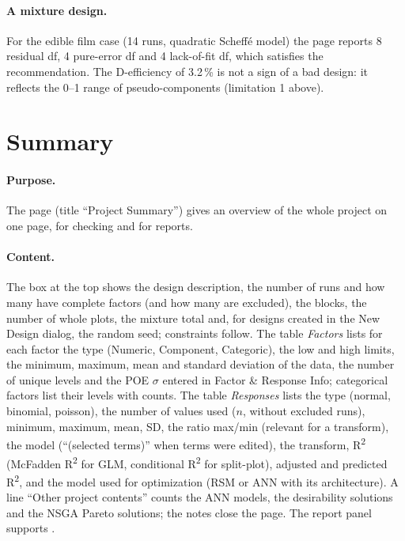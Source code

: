 \paragraph{A mixture design.} For the edible film case (14 runs, quadratic Scheff\'e model) the page reports 8
residual df, 4 pure-error df and 4 lack-of-fit df, which satisfies the recommendation. The D-efficiency of 3.2\,\%
is not a sign of a bad design: it reflects the 0--1 range of pseudo-components (limitation 1 above).

\section{Summary}
\label{sec:ch04-summary}

\paragraph{Purpose.} The  page (title ``Project Summary'') gives an overview of the whole project on one
page, for checking and for reports.

\paragraph{Content.} The box at the top shows the design description, the number of runs and how many have complete
factors (and how many are excluded), the blocks, the number of whole plots, the mixture total and, for designs created in the New
Design dialog, the random seed; constraints follow. The table \emph{Factors} lists for each factor the type (Numeric, Component,
Categoric), the low and high limits, the minimum, maximum, mean and standard deviation of the data, the number of
unique levels and the POE $\sigma$ entered in Factor \& Response Info; categorical factors list their levels with
counts. The table \emph{Responses} lists the type (normal, binomial, poisson), the number of values used ($n$, without
excluded runs), minimum, maximum, mean, SD, the ratio max/min (relevant for a transform), the model (``(selected
terms)'' when terms were edited), the transform, R\textsuperscript{2} (McFadden R\textsuperscript{2} for GLM,
conditional R\textsuperscript{2} for split-plot), adjusted and predicted R\textsuperscript{2}, and the model used for
optimization (RSM or ANN with its architecture). A line ``Other project contents'' counts the ANN models, the
desirability solutions and the NSGA Pareto solutions; the notes close the page. The report panel supports
.

